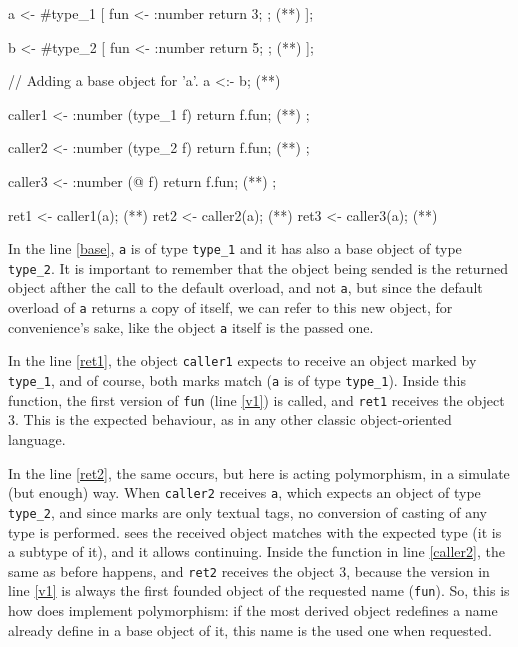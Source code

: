 \documentclass{article}
\begin{document}
\begin{faupp2}
  a <- #type_1 [
         fun <- :number { return 3; }; (*\label{v1}*)
       ];

  b <- #type_2 [
         fun <- :number { return 5; }; (*\label{v2}*)
       ];

  // Adding a base object for 'a'.
  a <:- b; (*\label{base}*)

  caller1 <- :number (type_1 f) {
                return f.fun; (*\label{caller1}*)
             };

  caller2 <- :number (type_2 f) {
                return f.fun; (*\label{caller2}*)
             };

  caller3 <- :number (@ f) {
               return f.fun; (*\label{caller3}*)
             };

  ret1 <- caller1(a); (*\label{ret1}*)
  ret2 <- caller2(a); (*\label{ret2}*)
  ret3 <- caller3(a); (*\label{ret3}*)
\end{faupp2}

In the line \ref{base}, \texttt{a} is of type \texttt{type\_1} and it has also a
base object of type \texttt{type\_2}. It is important to remember that the
object being sended is the returned object afther the call to the default
overload, and not \texttt{a}, but since the default overload of \texttt{a}
returns a copy of itself, we can refer to this new object, for convenience's
sake, like the object \texttt{a} itself is the passed one.

In the line \ref{ret1}, the object \texttt{caller1} expects to receive an object
marked by \texttt{type\_1}, and of course, both marks match (\texttt{a} is of
type \texttt{type\_1}). Inside this function, the first version of \texttt{fun}
  (line \ref{v1}) is called, and \texttt{ret1} receives the object 3. This is
  the expected behaviour, as in any other classic object-oriented language.

In the line \ref{ret2}, the same occurs, but here is acting polymorphism, in a
simulate (but enough) way. When \texttt{caller2} receives \texttt{a}, which
expects an object of type \texttt{type\_2}, and since marks are only textual
tags, no conversion of casting of any type is performed. \ffaupp sees the
received object matches with the expected type (it is a subtype of it), and it
allows continuing. Inside the function in line \ref{caller2}, the same as before
happens, and \texttt{ret2} receives the object 3, because the version in line
\ref{v1} is always the first founded object of the requested name
(\texttt{fun}). So, this is how does \faupp implement polymorphism: if the most
derived object redefines a name already define in a base object of it, this
name is the used one when requested.
\end{document}
